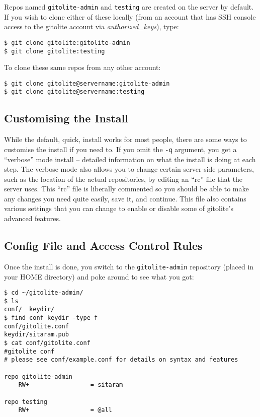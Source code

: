 \documentclass[a4paper]{book}
\begin{document}
Repos named \texttt{gitolite-admin} and \texttt{testing} are created on the server by default. If you wish to clone either of these locally (from an account that has SSH console access to the gitolite account via \emph{authorized\_keys}), type:

\begin{shaded}\begin{verbatim}
$ git clone gitolite:gitolite-admin
$ git clone gitolite:testing
\end{verbatim}\end{shaded}

To clone these same repos from any other account:

\begin{shaded}\begin{verbatim}
$ git clone gitolite@servername:gitolite-admin
$ git clone gitolite@servername:testing
\end{verbatim}\end{shaded}

\subsection{Customising the Install}

While the default, quick, install works for most people, there are some ways to customise the install if you need to. If you omit the \texttt{-q} argument, you get a “verbose” mode install -- detailed information on what the install is doing at each step. The verbose mode also allows you to change certain server-side parameters, such as the location of the actual repositories, by editing an “rc” file that the server uses. This “rc” file is liberally commented so you should be able to make any changes you need quite easily, save it, and continue. This file also contains various settings that you can change to enable or disable some of gitolite's advanced features.

\subsection{Config File and Access Control Rules}

Once the install is done, you switch to the \texttt{gitolite-admin} repository (placed in your HOME directory) and poke around to see what you got:

\begin{shaded}\begin{verbatim}
$ cd ~/gitolite-admin/
$ ls
conf/  keydir/
$ find conf keydir -type f
conf/gitolite.conf
keydir/sitaram.pub
$ cat conf/gitolite.conf
#gitolite conf
# please see conf/example.conf for details on syntax and features

repo gitolite-admin
    RW+                 = sitaram

repo testing
    RW+                 = @all
\end{verbatim}\end{shaded}
\end{document}
